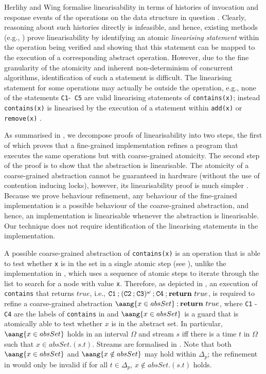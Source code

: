 \documentclass{article}
\theoremstyle{plain}
\newcounter{thm}
\theoremstyle{definition}
\def\ch{\mathbin{;}}
\begin{document}
Herlihy and Wing formalise linearisability in terms of histories of
invocation and response events of the operations on the data structure
in question \cite{Herlihy90}. Clearly, reasoning about such histories
directly is infeasible, and hence, existing methods (e.g.,
\cite{CGLM06,DSW11,VHHS06}) prove linearisability by identifying an
atomic {\em linearising statement} within the operation being verified
and showing that this statement can be mapped to the execution of a
corresponding abstract operation.  However, due to the fine
granularity of the atomicity and inherent non-determinism of
concurrent algorithms, identification of such a statement is
difficult. The linearising statement for some operations may actually
be outside the operation, e.g., none of the statements {\tt C1}-{\tt
  C5} are valid linearising statements of {\tt contains(x)}; instead
{\tt contains(x)} is linearised by the execution of a statement within
{\tt add(x)} or {\tt remove(x)} \cite{DSW11}.


As summarised in , we decompose proofs of
linearisability into two steps, the first of which proves that a
fine-grained implementation refines a program that executes the same
operations but with coarse-grained atomicity. The second step of the
proof is to show that the abstraction is linearisable. The atomicity
of a coarse-grained abstraction cannot be guaranteed in hardware
(without the use of contention inducing locks), however, its
linearisability proof is much simpler \cite{DDH12}. Because we prove
behaviour refinement, any behaviour of the fine-grained implementation
is a possible behaviour of the coarse-grained abstraction, and hence,
an implementation is linearisable whenever the abstraction is
linearisable. Our technique does not require identification of the
linearising statements in the implementation.

A possible coarse-grained abstraction of {\tt contains(x)} is an
operation that is able to test whether {\tt x} is in the set in a
single atomic step (see ), unlike the implementation
in , which uses a sequence of atomic steps to
iterate through the list to search for a node with value {\tt x}.
Therefore, as depicted in , an execution of {\tt
  contains} that returns $true$, i.e., $\texttt{C1} \ch (\texttt{C2}
\ch \texttt{C3})^\omega \ch \texttt{C4} \ch {\bf return}\ true$, is
required to refine a coarse-grained abstraction $\aang{x \in absSet}
\ch {\bf return}\ true$, where {\tt C1} - {\tt C4} are the labels of
{\tt contains} in  and $\aang{x \in absSet}$ is a
guard that is atomically able to test whether $x$ is in the abstract
set.  In particular, $\aang{x \in absSet}$ holds in an interval
$\Omega$ and stream $s$ iff there is a time $t$ in $\Omega$ such that
$x \in absSet.(s.t)$. Streams are formalised in
. Note that both $\aang{x \in absSet}$
and $\aang{x \notin absSet}$ may hold within $\Delta_p$; the
refinement in  would only be invalid if for all $t \in
\Delta_p$, $x \notin absSet.(s.t)$ holds. 
\end{document}

